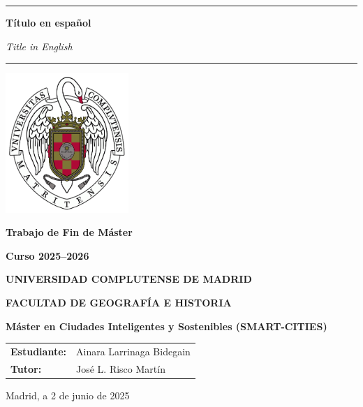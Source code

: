 \documentclass[11pt,a4paper]{book}
\begin{document}
\frontmatter
\begin{titlepage}
\centering

\rule{12cm}{1pt}

{\Large \textbf{Título en español} \par}

{\Large \textit{Title in English} \par} 

\rule{12cm}{1pt}

\includegraphics[width=0.35\textwidth]{core/logo_ucm.png}

{\Large \textbf{Trabajo de Fin de Máster}} \\
{\Large \textbf{Curso 2025--2026} \par}

{\Large \textbf{UNIVERSIDAD COMPLUTENSE DE MADRID} \par}
\vspace{0.5cm}
{\Large \textbf{FACULTAD DE GEOGRAFÍA E HISTORIA} \par}
\vspace{1.5cm}

{\Large \textbf{Máster en Ciudades Inteligentes y Sostenibles (SMART-CITIES)} \par} 

\vspace{1cm}


\vfill 

\begin{tabular}{l l}
{\Large\textbf{Estudiante:}} & {\Large Ainara Larrinaga Bidegain} \\[1em] {\Large\textbf{Tutor:}}   & {\Large José L. Risco Martín} \\    
\end{tabular}
\vfill

{\Large Madrid, a 2 de junio de 2025 \par}
\vspace{1cm}
    
\end{titlepage}
\end{document}
